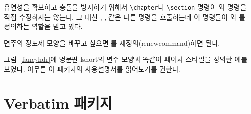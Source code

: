 유연성을 확보하고 충돌을 방지하기 위해서 \verb|\chapter|나 \verb|\section| 명령이 와  명령을 직접 수정하지는 않는다. 그 대신 , ,  같은 다른 명령을 호출하는데 이 명령들이 와 를 정의하는 역할을 맡고 있다.

면주의 장표제 모양을 바꾸고 싶으면 를 재정의(renewcommand)하면 된다.

그림~\ref{fancyhdr}에 영문판 lshort의 면주 모양과 똑같이 페이지 스타일을 정의한 예를 보였다. 아무튼 이 패키지의 사용설명서를 읽어보기를 권한다.

\section{Verbatim 패키지}

